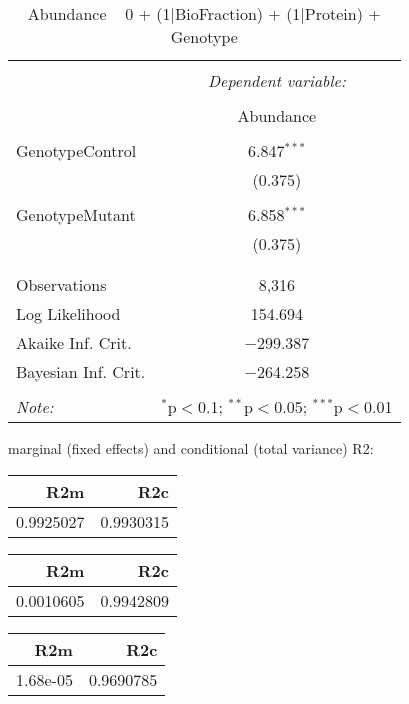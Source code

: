 \documentclass[11pt]{report}
\begin{document}
\begin{table}[!htbp] \centering 
  \caption{Abundance ~ 0 + (1|BioFraction) + (1|Protein) + Genotype} 
  \label{} 
\begin{tabular}{@{\extracolsep{5pt}}lc} 
\\[-1.8ex]\hline 
\hline \\[-1.8ex] 
 & \multicolumn{1}{c}{\textit{Dependent variable:}} \\ 
\cline{2-2} 
\\[-1.8ex] & Abundance \\ 
\hline \\[-1.8ex] 
 GenotypeControl & 6.847$^{***}$ \\ 
  & (0.375) \\ 
  & \\ 
 GenotypeMutant & 6.858$^{***}$ \\ 
  & (0.375) \\ 
  & \\ 
\hline \\[-1.8ex] 
Observations & 8,316 \\ 
Log Likelihood & 154.694 \\ 
Akaike Inf. Crit. & $-$299.387 \\ 
Bayesian Inf. Crit. & $-$264.258 \\ 
\hline 
\hline \\[-1.8ex] 
\textit{Note:}  & \multicolumn{1}{r}{$^{*}$p$<$0.1; $^{**}$p$<$0.05; $^{***}$p$<$0.01} \\ 
\end{tabular} 
\end{table} 
marginal (fixed effects) and conditional (total variance) R2:

\begin{tabular}{r|r}
\hline
R2m & R2c\\
\hline
0.9925027 & 0.9930315\\
\hline
\end{tabular}

\begin{tabular}{r|r}
\hline
R2m & R2c\\
\hline
0.0010605 & 0.9942809\\
\hline
\end{tabular}

\begin{tabular}{r|r}
\hline
R2m & R2c\\
\hline
1.68e-05 & 0.9690785\\
\hline
\end{tabular}
\end{document}
